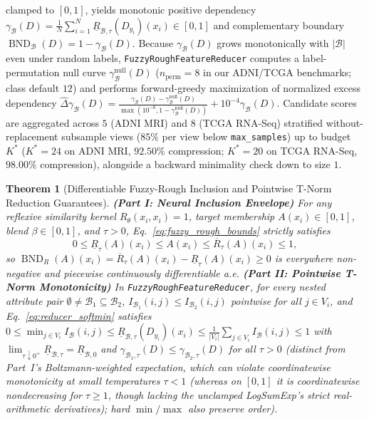 \documentclass[10pt,twocolumn]{article}
\newtheorem{theorem}{Theorem}
\begin{document}
clamped to $[0,1]$, yields monotonic positive dependency $\gamma_{\mathcal{B}}(D) =
\frac{1}{N}\sum_{i=1}^N \underline{R}_{\mathcal{B},\tau}(D_{y_i})(x_i) \in [0,1]$ and
complementary boundary $\operatorname{BND}_{\mathcal{B}}(D) = 1 - \gamma_{\mathcal{B}}(D)$.
Because $\gamma_{\mathcal{B}}(D)$ grows monotonically with $|\mathcal{B}|$ even under random
labels, \texttt{FuzzyRoughFeatureReducer} computes a label-permutation null curve
$\gamma_{\mathcal{B}}^{\text{null}}(D)$ ($n_{\text{perm}}=8$ in our ADNI/TCGA benchmarks; class
default $12$) and performs forward-greedy maximization of normalized excess dependency
$\widehat{\Delta}\gamma_{\mathcal{B}}(D) = \frac{\gamma_{\mathcal{B}}(D) -
\gamma_{\mathcal{B}}^{\text{null}}(D)}{\max(10^{-6}, 1 -
\gamma_{\mathcal{B}}^{\text{null}}(D))} + 10^{-4}\gamma_{\mathcal{B}}(D)$. Candidate scores are
aggregated across $5$ (ADNI MRI) and $8$ (TCGA RNA-Seq) stratified without-replacement
subsample views ($85\%$ per view below \texttt{max\_\allowbreak samples}) up to budget
$K^*$ ($K^*=24$ on ADNI MRI, $92.50\%$ compression; $K^*=20$ on TCGA RNA-Seq, $98.00\%$
compression), alongside a backward minimality check down to size $1$.

\begin{theorem}[Differentiable Fuzzy-Rough Inclusion and Pointwise T-Norm Reduction Guarantees]
\label{thm:rough}
\textbf{(Part I: Neural Inclusion Envelope)} For any reflexive similarity kernel $R_\theta(x_i,
x_i) = 1$, target membership $A(x_i) \in [0, 1]$, blend $\beta \in [0, 1]$, and $\tau > 0$,
Eq.~\eqref{eq:fuzzy_rough_bounds} strictly satisfies
\begin{equation}
0 \le \underline{R}_\tau(A)(x_i) \le A(x_i) \le \overline{R}_\tau(A)(x_i) \le 1,
\end{equation}
so $\operatorname{BND}_R(A)(x_i) = \overline{R}_\tau(A)(x_i) - \underline{R}_\tau(A)(x_i) \ge
0$ is everywhere non-negative and piecewise continuously differentiable a.e. \textbf{(Part II:
Pointwise T-Norm Monotonicity)} In \texttt{FuzzyRoughFeatureReducer}, for every nested
attribute pair $\emptyset \neq \mathcal{B}_1 \subseteq \mathcal{B}_2$, $I_{\mathcal{B}_1}(i,j)
\le I_{\mathcal{B}_2}(i,j)$ pointwise for all $j \in V_i$, and Eq.~\eqref{eq:reducer_softmin}
satisfies $0 \le \min_{j\in V_i} I_{\mathcal{B}}(i,j) \le
\underline{R}_{\mathcal{B},\tau}(D_{y_i})(x_i) \le \frac{1}{|V_i|}\sum_{j\in V_i}
I_{\mathcal{B}}(i,j) \le 1$ with $\lim_{\tau \downarrow 0^+} \underline{R}_{\mathcal{B},\tau} =
\underline{R}_{\mathcal{B},0}$ and $\gamma_{\mathcal{B}_1,\tau}(D) \le
\gamma_{\mathcal{B}_2,\tau}(D)$ for all $\tau > 0$ (distinct from Part~I's Boltzmann-weighted
expectation, which can violate coordinatewise monotonicity at small temperatures $\tau<1$
(whereas on $[0,1]$ it is coordinatewise nondecreasing for $\tau\ge1$, though lacking
the unclamped LogSumExp's strict real-arithmetic derivatives); hard $\min/\max$ also preserve
order).
\end{theorem}
\end{document}
